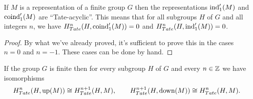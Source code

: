 \begin{lemma}
	If $M$ is a representation of a finite group $G$ then the representations
	$\mathrm{ind}_1'(M)$ and $\mathrm{coind}_1'(M)$ are ``Tate-acyclic''. This means that for all
	subgroups $H$ of $G$ and all integers $n$, we have
	$H^n_{Tate}(H,\mathrm{coind}_1'(M)) = 0$ and $H^n_{Tate}(H,\mathrm{ind}_1'(M)) = 0$.
\end{lemma}

\begin{proof}
	By what we've already proved, it's sufficient to prove this in the cases $n = 0$ and $n = -1$.
	These cases can be done by hand.
\end{proof}






\begin{corollary}
	If the group $G$ is finite then for every subgroup $H$ of $G$
	and every $n \in {\mathbb Z}$ we have isomorphisms
	\[
		H^n_{Tate}(H, \mathrm{up}(M)) \cong H^{n+1}_{Tate}(H,M),
		\qquad
		H^{n+1}_{Tate}(H, \mathrm{down}(M)) \cong H^{n}_{Tate}(H,M).
	\]
\end{corollary}





